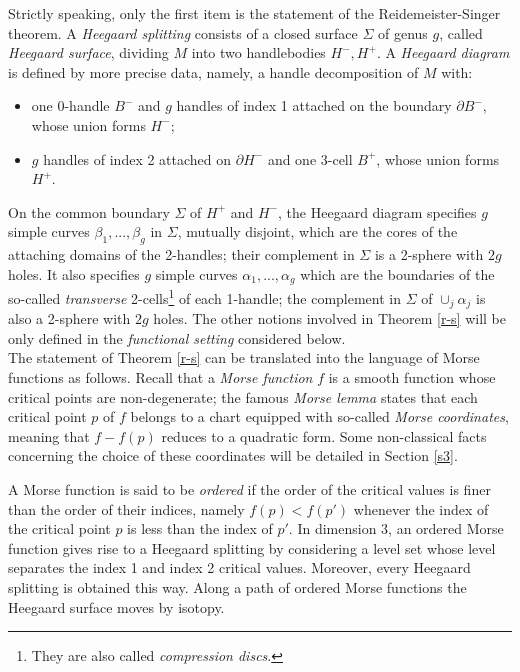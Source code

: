 \documentclass[12pt]{amsart}
\def\al{\alpha}
\def\Si{\Sigma}
\begin{document}
Strictly speaking, only the first item  is the statement of the Reidemeister-Singer theorem.
 A {\it Heegaard splitting } consists of a closed surface $\Si$ of genus $g$, called {\it Heegaard surface},
 dividing  $M$ into two handlebodies $H^-, H^+$. A {\it Heegaard diagram} is defined by
 more precise data, namely,
a handle decomposition of $M$ with:
\begin{itemize}
\item one 0-handle $B^-$ and $g$ handles of index 1 attached on the boundary   $\partial B^-$,
whose union forms $H^-$;
\item $g$ handles of index 2  attached on $\partial H^-$ and one 3-cell $B^+$, whose union forms 
$H^+$.
\end{itemize}
On the common boundary $\Si$ of $H^+$ and $H^-$, the Heegaard diagram specifies
 $g$ simple curves $\beta_1,...,\beta_g$ in $\Si$,
 mutually disjoint,  which are the cores of the attaching domains 
of the 2-handles; their complement in $\Si$ is a 2-sphere with $2g$ holes.
 It also specifies $g$ simple
curves $\al_1,...,\al_g$ which are the boundaries of the so-called {\it transverse} 2-cells\footnote{They are also called {\it compression discs}.}
of each 1-handle; %
the complement in $\Si$ of $\cup_j\al_j$ is also a 2-sphere with $2g$ holes. The other notions %
involved in Theorem \ref{r-s} will be only defined in the {\it functional  setting} considered below.\\


  
The statement  of Theorem \ref{r-s} can be 
  translated into the language of Morse functions
as follows. 
Recall that a  {\it Morse function}  $f$ is a smooth function whose critical points are non-degenerate; 
the famous {\it Morse lemma} states  that each critical point $p$ of $f$
belongs to a chart equipped with 
 so-called
{\it Morse coordinates}, meaning that $f-f(p)$ %
reduces  to  a quadratic form. 
Some non-classical facts  concerning the choice of these coordinates will be detailed in Section \ref{s3}.

A Morse function 
is said to be 
{\it ordered} if the order of the  critical values is finer than the order
of  their indices, namely $f(p)<f(p')$ whenever the index of the critical point $p$ is less than the index of 
$p'$. In dimension 3, an ordered Morse function gives rise to a Heegaard splitting 
by considering a level set whose level separates the index 1 and index 2 critical values.
Moreover, every Heegaard splitting is obtained this way.
Along a path of ordered Morse functions the  Heegaard surface moves by isotopy.
\end{document}
